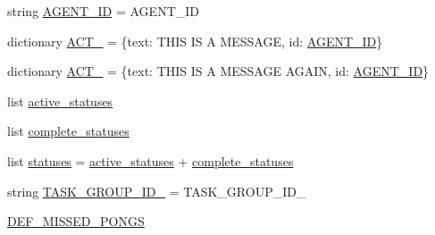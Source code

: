 \begin{DoxyCompactItemize}
\item 
string \hyperlink{namespaceparlai_1_1mturk_1_1core_1_1legacy__2018_1_1test_1_1test__full__system_a81996caa572736ce59c38f52c21430cb}{A\+G\+E\+N\+T\+\_\+\+ID} = \textquotesingle{}A\+G\+E\+N\+T\+\_\+\+ID\textquotesingle{}
\item 
dictionary \hyperlink{namespaceparlai_1_1mturk_1_1core_1_1legacy__2018_1_1test_1_1test__full__system_a263204a8dd725ca0e6088b894db178b6}{A\+C\+T\+\_} = \{\textquotesingle{}text\textquotesingle{}\+: \textquotesingle{}T\+H\+IS IS A M\+E\+S\+S\+A\+GE\textquotesingle{}, \textquotesingle{}id\textquotesingle{}\+: \hyperlink{namespaceparlai_1_1mturk_1_1core_1_1legacy__2018_1_1test_1_1test__full__system_a81996caa572736ce59c38f52c21430cb}{A\+G\+E\+N\+T\+\_\+\+ID}\}
\item 
dictionary \hyperlink{namespaceparlai_1_1mturk_1_1core_1_1legacy__2018_1_1test_1_1test__full__system_a0af4f9ec6e097e96ac9f1962bf912320}{A\+C\+T\+\_} = \{\textquotesingle{}text\textquotesingle{}\+: \textquotesingle{}T\+H\+IS IS A M\+E\+S\+S\+A\+GE A\+G\+A\+IN\textquotesingle{}, \textquotesingle{}id\textquotesingle{}\+: \hyperlink{namespaceparlai_1_1mturk_1_1core_1_1legacy__2018_1_1test_1_1test__full__system_a81996caa572736ce59c38f52c21430cb}{A\+G\+E\+N\+T\+\_\+\+ID}\}
\item 
list \hyperlink{namespaceparlai_1_1mturk_1_1core_1_1legacy__2018_1_1test_1_1test__full__system_a8c2be4072fafac6c688d611cf677f11b}{active\+\_\+statuses}
\item 
list \hyperlink{namespaceparlai_1_1mturk_1_1core_1_1legacy__2018_1_1test_1_1test__full__system_a9a6528b231b6e6dba1d60ce088d2347c}{complete\+\_\+statuses}
\item 
list \hyperlink{namespaceparlai_1_1mturk_1_1core_1_1legacy__2018_1_1test_1_1test__full__system_adb95786a16caebec33bcb9bd7da16559}{statuses} = \hyperlink{namespaceparlai_1_1mturk_1_1core_1_1legacy__2018_1_1test_1_1test__full__system_a8c2be4072fafac6c688d611cf677f11b}{active\+\_\+statuses} + \hyperlink{namespaceparlai_1_1mturk_1_1core_1_1legacy__2018_1_1test_1_1test__full__system_a9a6528b231b6e6dba1d60ce088d2347c}{complete\+\_\+statuses}
\item 
string \hyperlink{namespaceparlai_1_1mturk_1_1core_1_1legacy__2018_1_1test_1_1test__full__system_a4714ed67e12bca67bd585e9974461530}{T\+A\+S\+K\+\_\+\+G\+R\+O\+U\+P\+\_\+\+I\+D\+\_} = \textquotesingle{}T\+A\+S\+K\+\_\+\+G\+R\+O\+U\+P\+\_\+\+I\+D\+\_\textquotesingle{}
\item 
\hyperlink{namespaceparlai_1_1mturk_1_1core_1_1legacy__2018_1_1test_1_1test__full__system_a80a3391383b60baad366ded072b967de}{D\+E\+F\+\_\+\+M\+I\+S\+S\+E\+D\+\_\+\+P\+O\+N\+GS}

\end{DoxyCompactItemize}

